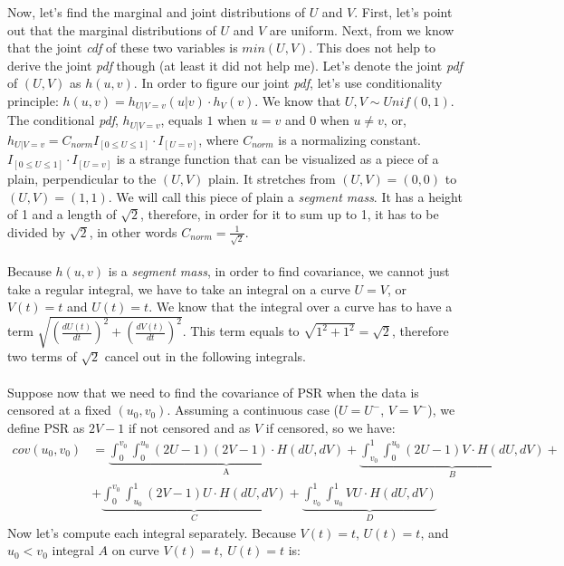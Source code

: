 \documentclass[]{article}
\begin{document}
Now, let's find the marginal and joint distributions of $U$ and $V$. First, let's point out that the marginal distributions of $U$ and $V$ are uniform. Next, from \cite{nelsen2007introduction} we know that the joint \emph{cdf} of these two variables is $min(U, V)$. This does not help to derive the joint \emph{pdf} though (at least it did not help me). Let's denote the joint \emph{pdf} of $(U, V)$ as $h(u, v)$. In order to figure our joint \emph{pdf}, let's use conditionality principle: $h(u, v)=h_{U|V=v}(u|v)\cdot h_V(v)$. We know that $U,V \sim Unif(0, 1)$. The conditional \emph{pdf}, $h_{U|V=v}$, equals $1$ when $u=v$ and $0$ when $u\neq v$, or, $h_{U|V=v} = C_{norm}I_{[0\leq U \leq 1]}\cdot I_{[U=v]}$, where $C_{norm}$ is a normalizing constant. $I_{[0\leq U \leq 1]}\cdot I_{[U=v]}$ is a strange function that can be visualized as a piece of a plain, perpendicular to the $(U,V)$ plain. It stretches from $(U,V) = (0, 0)$ to $(U,V) = (1,1)$. We will call this piece of plain a \emph{segment mass}. It has a height of 1 and a length of $\sqrt{2}$, therefore, in order for it to sum up to 1, it has to be divided by $\sqrt{2}$, in other words $C_{norm}=\frac{1}{\sqrt{2}}$.\\
~\\
Because $h(u, v)$ is a \emph{segment mass}, in order to find covariance, we cannot just take a regular integral, we have to take an integral on a curve $U=V$, or $V(t)=t$ and $U(t) = t$. We know that the integral over a curve has to have a term $\sqrt{\left(\frac{dU(t)}{dt}\right)^2 + \left(\frac{dV(t)}{dt}\right)^2}$. This term equals to $\sqrt{1^2 + 1^2} = \sqrt{2}$, therefore two terms of $\sqrt{2}$ cancel out in the following integrals.\\
~\\
Suppose now that we need to find the covariance of PSR when the data is censored at a fixed $(u_0, v_0)$. Assuming a continuous case ($U = U^-$, $V = V^-$), we define PSR as $2V - 1$ if not censored and as $V$ if censored, so we have:
	$$
	\begin{aligned}
    cov(u_0, v_0) &= \underbrace{\int_0^{v_0}\int_0^{u_0} (2U - 1)(2V - 1)\cdot H(dU, dV)}_{\text{A}} + \underbrace{\int_{v_0}^{1}\int_0^{u_0} (2U - 1)V\cdot H(dU, dV)}_{B} + \\
    &+\underbrace{\int_{0}^{v_0}\int_{u_0}^1 (2V - 1)U\cdot H(dU, dV)}_{C} + \underbrace{\int_{v_0}^{1}\int_{u_0}^1 VU\cdot H(dU, dV)}_{D}
	\end{aligned}
	$$
Now let's compute each integral separately. Because $V(t)=t$, $U(t) = t$, and $u_0 < v_0$ integral $A$ on curve $V(t)=t,~U(t) = t$ is:
\end{document}

